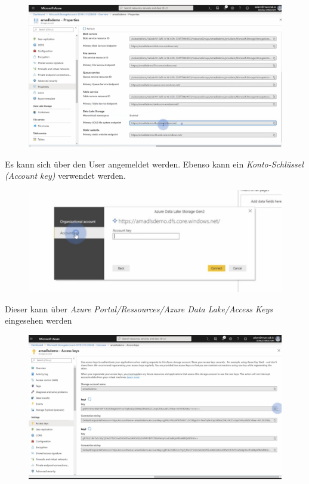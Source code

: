 \begin{figure}[H]
	\centering
	\includegraphics[scale = 0.2]{attachment/chapter_2/Scc126}
\end{figure}

Es kann sich über den User angemeldet werden. Ebenso kann ein \textit{Konto-Schlüssel (Account key)} verwendet werden.

\begin{figure}[H]
	\centering
	\includegraphics[scale = 0.2]{attachment/chapter_2/Scc128}
\end{figure}

Dieser kann über \textit{Azure Portal/Ressources/Azure Data Lake/Access Keys} eingesehen werden

\begin{figure}[H]
	\centering
	\includegraphics[scale = 0.2]{attachment/chapter_2/Scc127}
\end{figure}


